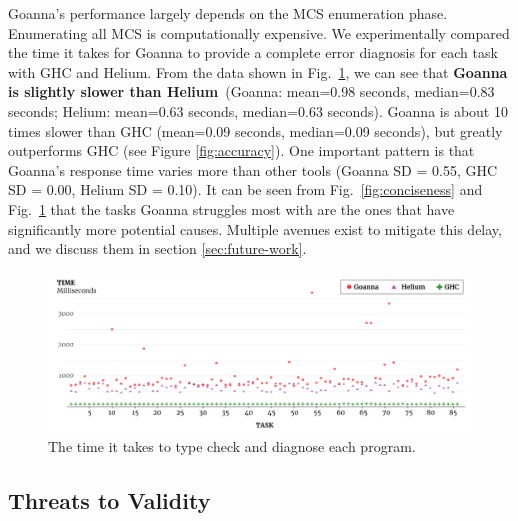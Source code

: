     Goanna's performance largely depends on the MCS enumeration phase. Enumerating all MCS is computationally expensive. We experimentally compared the time it takes for Goanna to provide a complete error diagnosis for each task with GHC and Helium. From the data shown in Fig.~\ref{fig:performance}, we can see that \textbf{Goanna is slightly slower than Helium}~(Goanna: mean=0.98 seconds, median=0.83 seconds; Helium: mean=0.63 seconds, median=0.63 seconds). Goanna is about 10 times slower than GHC (mean=0.09 seconds, median=0.09 seconds), but greatly outperforms GHC (see Figure \ref{fig:accuracy}). One important pattern is that Goanna's response time varies more than other tools (Goanna SD = 0.55, GHC SD = 0.00, Helium SD = 0.10). It can be seen from Fig.~\ref{fig:conciseness} and Fig.~\ref{fig:performance} that the tasks Goanna struggles most with are the ones that have significantly more potential causes. Multiple avenues exist to mitigate this delay, and we discuss them in section \ref{sec:future-work}.
    
    \begin{figure}[ht!]
        \centering
        \includegraphics[width=\linewidth]{images/Performance}
        \caption{The time it takes to type check and diagnose each program.}
        \label{fig:performance}
    \end{figure}

	
	



    \subsection{Threats to Validity}

